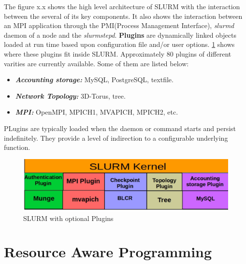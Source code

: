 The figure x.x shows the high level architecture of SLURM with the interaction between the several of its key components. It also shows the interaction between an MPI application through the PMI(Process Management Interface), \textit{slurmd} daemon of a node and the \textit{slurmstepd}.
\textbf{Plugins} are dynamically linked objects loaded at run time based upon configuration file and/or user options. \ref{fig:6} shows where these plugins fit inside SLURM. Approximately $80$ plugins of different varities are currently available. Some of them are listed below:
\begin{itemize}
\item \textbf{\textit{Accounting storage:}} MySQL, PostgreSQL, textfile.
\item \textbf{\textit{Network Topology:}} 3D-Torus, tree.
\item \textbf{\textit{MPI:}} OpenMPI, MPICH1, MVAPICH, MPICH2, etc.
\end{itemize}
PLugins are typically loaded when the daemon or command starts and persist indefinitely. They provide a level of indirection to a configurable underlying function.
\begin{figure}[!htbp]
\centering
\includegraphics[width=1.0\textwidth]{./figures/plugin.eps}
\vspace{-0.15in}
\caption{SLURM with optional Plugins}
\label{fig:6}
\end{figure}
\section{Resource Aware Programming}
